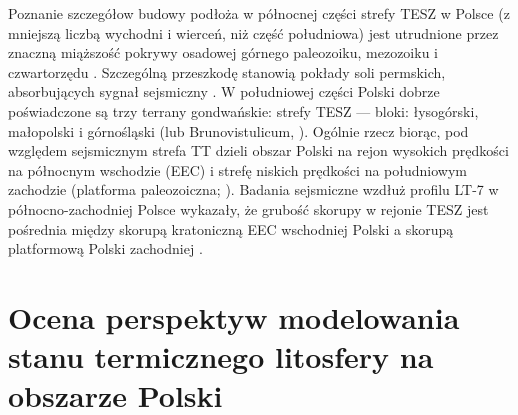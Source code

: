 \documentclass[11.5pt,twoside]{report}
\renewcommand{\headrulewidth}{0pt}}
\begin{document}
Poznanie szczegółow budowy podłoża w północnej części strefy TESZ w Polsce (z mniejszą liczbą wychodni i wierceń, niż część południowa) jest utrudnione przez znaczną miąższość pokrywy osadowej górnego paleozoiku, mezozoiku i czwartorzędu \parencite{Belka.2002}. Szczególną przeszkodę stanowią pokłady soli permskich, absorbujących sygnał sejsmiczny \parencite{Guterch.1998}. W południowej części Polski dobrze poświadczone są trzy terrany gondwańskie: strefy TESZ --- bloki: łysogórski, małopolski i górnośląski (lub Brunovistulicum, \cite{Bula.2008,Belka.2002}). Ogólnie rzecz biorąc, pod względem sejsmicznym strefa TT dzieli obszar Polski na rejon wysokich prędkości na północnym wschodzie (EEC) i strefę niskich prędkości na południowym zachodzie (platforma paleozoiczna; \cite{Guterch.1998}). Badania sejsmiczne wzdłuż profilu LT-7 w północno-zachodniej Polsce wykazały, że grubość skorupy w rejonie TESZ jest pośrednia między skorupą kratoniczną EEC wschodniej Polski a skorupą platformową Polski zachodniej \parencite{Guterch.1994}. 

\chapter{Ocena perspektyw modelowania stanu termicznego litosfery na obszarze Polski}

\renewcommand\headrulewidth{0pt} %
{\renewcommand{\markboth}[2]{} %
	\printbibliography[heading=bibintoc,title=Bibliografia]} %
\end{document}
